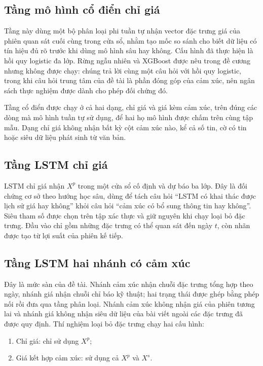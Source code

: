 \subsection{Tầng mô hình cổ điển chỉ giá}

Tầng này dùng một bộ phân loại phi tuần tự nhận vector đặc trưng giá của phiên quan
sát cuối cùng trong cửa sổ, nhằm tạo mốc so sánh cho biết dữ liệu có tín hiệu đủ rõ
trước khi dùng mô hình sâu hay không. Cấu hình đã thực hiện là hồi quy logistic đa
lớp. Rừng ngẫu nhiên và XGBoost được nêu trong đề cương nhưng không được chạy: chúng
trả lời cùng một câu hỏi với hồi quy logistic, trong khi câu hỏi trung tâm của đề
tài là phần đóng góp của cảm xúc, nên ngân sách thực nghiệm được dành cho phép đối
chứng đó.

Tầng cổ điển được chạy ở cả hai dạng, chỉ giá và giá kèm cảm xúc, trên đúng các dòng
mà mô hình tuần tự sử dụng, để hai họ mô hình được chấm trên cùng tập mẫu. Dạng chỉ
giá không nhận bất kỳ cột cảm xúc nào, kể cả số tin, cờ có tin hoặc siêu dữ liệu phát
sinh từ văn bản.

\subsection{Tầng LSTM chỉ giá}

LSTM chỉ giá nhận $X^p$ trong một cửa sổ cố định và dự báo ba lớp. Đây là đối chứng
cơ sở theo hướng học sâu, dùng để tách câu hỏi ``LSTM có khai thác được lịch sử giá
hay không'' khỏi câu hỏi ``cảm xúc có bổ sung thông tin hay không''. Siêu tham số
được chọn trên tập xác thực và giữ nguyên khi chạy loại bỏ đặc trưng. Đầu vào chỉ
gồm những đặc trưng có thể quan sát đến ngày $t$, còn nhãn được tạo từ lợi suất của
phiên kế tiếp.

\subsection{Tầng LSTM hai nhánh có cảm xúc}

Đây là mức sàn của đề tài. Nhánh cảm xúc nhận chuỗi đặc trưng tổng hợp theo ngày,
nhánh giá nhận chuỗi chỉ báo kỹ thuật; hai trạng thái được ghép bằng phép nối rồi đưa
qua tầng phân loại. Nhánh cảm xúc không nhận giá của phiên tương lai và nhánh giá
không nhận siêu dữ liệu của bài viết ngoài các đặc trưng đã được quy định. Thí
nghiệm loại bỏ đặc trưng chạy hai cấu hình:

\begin{enumerate}[nosep]
  \item Chỉ giá: chỉ sử dụng $X^p$;
  \item Giá kết hợp cảm xúc: sử dụng cả $X^p$ và $X^s$.
\end{enumerate}

